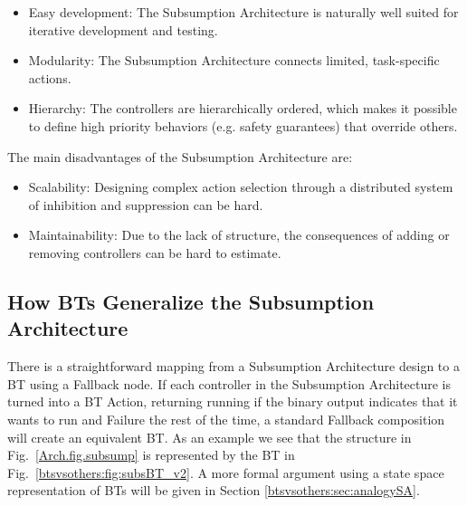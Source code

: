 \begin{itemize}
\item Easy development: The Subsumption Architecture is naturally well suited for iterative development and testing.
\item Modularity: The Subsumption Architecture connects limited, task-specific actions.
\item Hierarchy: The controllers are hierarchically ordered, which makes it possible to define high priority behaviors (e.g. safety guarantees) that override others.
\end{itemize}
The main disadvantages of the Subsumption Architecture are:
\begin{itemize}
\item Scalability:  Designing complex action selection through a distributed system of inhibition and suppression can be hard.
\item Maintainability: Due to the lack of structure, the consequences of adding or removing controllers can be hard to estimate. 
\end{itemize}

\subsection{How BTs Generalize the Subsumption Architecture}
There is a straightforward mapping from a Subsumption Architecture design to a BT using a Fallback node.
If each controller in the Subsumption Architecture is turned into a BT Action, returning running if the binary output indicates that it wants to run and Failure the rest of the time, 
a standard Fallback composition will create an equivalent BT.
As an example we see that the structure in Fig.~\ref{Arch.fig.subsump} is represented by the BT in Fig.~\ref{btsvsothers:fig:subsBT_v2}. A more formal argument using a state space representation of BTs will be given in Section \ref{btsvsothers:sec:analogySA}.


